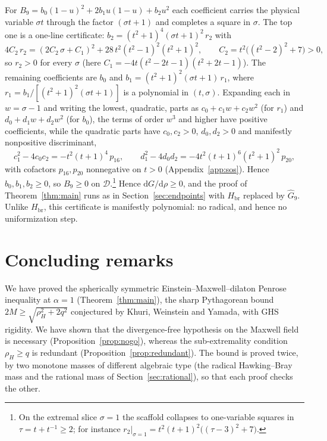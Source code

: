 \documentclass[11pt]{article}
\theoremstyle{plain}
\theoremstyle{definition}
\newcommand{\dd}{\mathrm{d}}
\newcommand{\rH}{\rho_{\!H}}
\newcommand{\Hbr}{H_{\mathrm{br}}}
\begin{document}
For $B_9=b_0(1-u)^2+2b_1u(1-u)+b_2u^2$ each coefficient carries the physical variable $\sigma t$ through the
factor $(\sigma t+1)$ and completes a square in $\sigma$. The top one is a one-line certificate:
$b_2=(t^2+1)^4(\sigma t+1)^2\,r_2$ with
\begin{equation*}
   4C_2\,r_2=(2C_2\,\sigma+C_1)^2+28\,t^2(t^2-1)^2(t^2+1)^2,\qquad C_2=t^2\big((t^2-2)^2+7\big)>0,
\end{equation*}
so $r_2>0$ for every $\sigma$ (here $C_1=-4t(t^2-2t-1)(t^2+2t-1)$). The remaining coefficients are $b_0$ and
$b_1=(t^2+1)^2(\sigma t+1)\,r_1$, where $r_1=b_1/[(t^2+1)^2(\sigma t+1)]$ is a polynomial in $(t,\sigma)$.
Expanding each in $w=\sigma-1$ and writing the lowest, quadratic, parts as $c_0+c_1w+c_2w^2$ (for $r_1$) and
$d_0+d_1w+d_2w^2$ (for $b_0$), the terms of order $w^3$ and higher have positive coefficients, while the
quadratic parts have $c_0,c_2>0$, $d_0,d_2>0$ and manifestly nonpositive discriminant,
\begin{equation}\label{eq:discid}
   c_1^2-4c_0c_2=-t^2(t+1)^4\,p_{16},\qquad d_1^2-4d_0d_2=-4t^2(t+1)^6(t^2+1)^2\,p_{20},
\end{equation}
with cofactors $p_{16},p_{20}$ nonnegative on $t>0$ (Appendix~\ref{app:sos}). Hence $b_0,b_1,b_2\ge0$, so
$B_9\ge0$ on $\mathcal D$.\footnote{On the extremal slice $\sigma=1$ the scaffold collapses to one-variable
squares in $\tau=t+t^{-1}\ge2$; for instance $r_2|_{\sigma=1}=t^2(t+1)^2\big((\tau-3)^2+7\big)$.} Hence $\dd G/\dd\rho\ge0$, and the proof of
Theorem~\ref{thm:main} runs as in Section~\ref{sec:endpoints} with $\Hbr$ replaced by $\widehat G_9$. Unlike
$\Hbr$, this certificate is manifestly polynomial: no radical, and hence no uniformization step.

\section{Concluding remarks}\label{sec:conclusion}

We have proved the spherically symmetric Einstein--Maxwell--dilaton Penrose inequality at $\alpha=1$
(Theorem~\ref{thm:main}), the sharp Pythagorean bound $2M\ge\sqrt{\rH^2+2q^2}$ conjectured by Khuri, Weinstein
and Yamada, with GHS rigidity. We have shown that the divergence-free hypothesis on the Maxwell field is
necessary (Proposition~\ref{prop:nogo}), whereas the sub-extremality condition $\rH\ge q$ is redundant
(Proposition~\ref{prop:redundant}). The bound is proved twice, by two monotone masses of different algebraic
type (the radical Hawking--Bray mass and the rational mass of Section~\ref{sec:rational}), so that each proof
checks the other.
\end{document}
